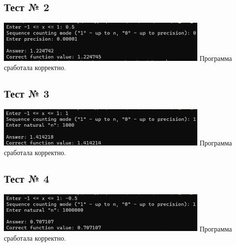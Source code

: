 \documentclass[12pt]{article}
\begin{document}
	\subsection*{Тест № 2}
	\includegraphics[width=400px]{test_2}
	Программа сработала корректно.
	
	\subsection*{Тест № 3}
	\includegraphics[width=400px]{test_3}
	Программа сработала корректно.
	
	\subsection*{Тест № 4}
	\includegraphics[width=400px]{test_4}
	Программа сработала корректно.
	
\end{document}
